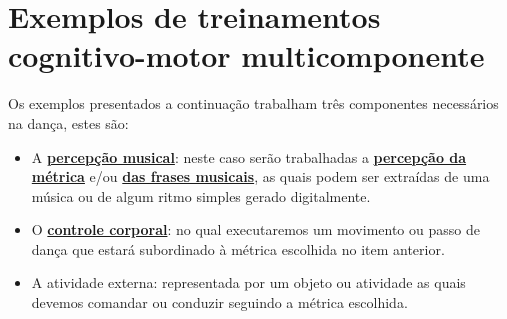 
\section{Exemplos de treinamentos cognitivo-motor multicomponente}

Os exemplos presentados a continuação trabalham três componentes necessários na dança,
estes são:
\begin{itemize}
\item A \hyperref[cap:percepcaomusical]{\textbf{percepção musical}}: 
neste caso serão trabalhadas a \hyperref[sec:percepcionmetrica]{\textbf{percepção da métrica}} 
e/ou \hyperref[sec:perceberfrases]{\textbf{das frases musicais}}, 
as quais podem ser extraídas de uma música ou de algum ritmo simples gerado digitalmente.
\item O \hyperref[sec:BodyControl]{\textbf{controle corporal}}: 
no qual executaremos um movimento ou passo de dança que estará subordinado
à métrica escolhida no item anterior.
\item A atividade externa: representada por um objeto ou atividade
as quais devemos comandar ou conduzir seguindo a métrica escolhida.
\end{itemize}


